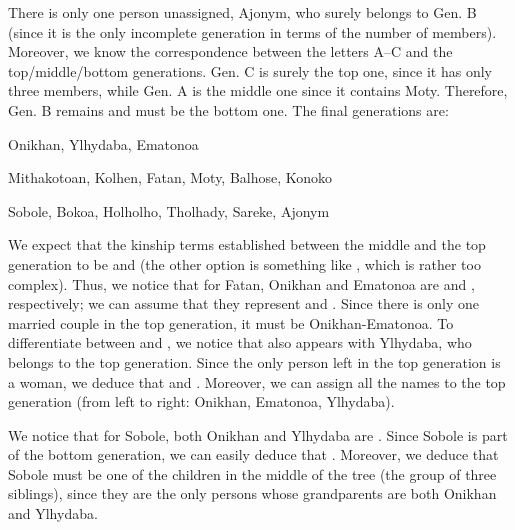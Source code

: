 \begin{refsection}
\begin{mysolution}
There is only one person unassigned, Ajonym, who surely belongs to Gen. B (since it is the only incomplete generation in terms of the number of members). Moreover, we know the correspondence between the letters A--C and the top/middle/bottom generations. Gen. C is surely the top one, since it has only three members, while Gen. A is the middle one since it contains Moty. Therefore, Gen. B remains and must be the bottom one. The final generations are:

\begin{description}[font=\normalfont]
    \item[Top generation:]  Onikhan, Ylhydaba, Ematonoa
    \item[Middle generation:]  Mithakotoan, Kolhen, Fatan, Moty, Balhose, Konoko
    \item[Bottom generation:]  Sobole, Bokoa, Holholho, Tholhady, Sareke, Ajonym
\end{description}

We expect that the kinship terms established between the middle and the top generation to be  and  (the other option is something like , which is rather too complex). Thus, we notice that for Fatan, Onikhan and Ematonoa are  and , respectively; we can assume that they represent  and . Since there is only one married couple in the top generation, it must be Onikhan-Ematonoa. To differentiate between  and , we notice that  also appears with Ylhydaba, who belongs to the top generation. Since the only person left in the top generation is a woman, we deduce that  and . Moreover, we can assign all the names to the top generation (from left to right: Onikhan, Ematonoa, Ylhydaba).

We notice that for Sobole, both Onikhan and Ylhydaba are . Since Sobole is part of the bottom generation, we can easily deduce that . Moreover, we deduce that Sobole must be one of the children in the middle of the tree (the group of three siblings), since they are the only persons whose grandparents are both Onikhan and Ylhydaba.


\end{mysolution}
\end{refsection}
